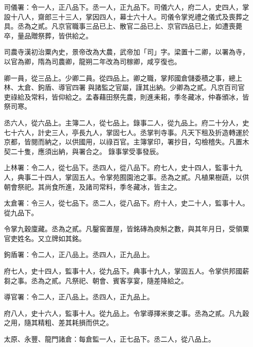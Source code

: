 \begin{pinyinscope}
 司儀署：令一人，正八品下。丞一人，正九品下。司儀六人，府二人，史四人，掌設十八人，齋郎三十三人，掌因四人，幕士六十人。司儀令掌兇禮之儀式及喪葬之具。丞為之貳。凡京官職事三品已上、散官二品已上、京官四品已上，如遭喪薨卒，量品贈祭葬，皆供給之。



 司農寺漢初治粟內史，景帝改為大農，武帝加「司」字。梁置十二卿，以署為寺，以官為卿，隋為司農卿，龍朔二年改為司稼卿，咸亨復也。



 卿一員，從三品上。少卿二員。從四品上。卿之職，掌邦國倉儲委積之事，總上林、太倉、鉤盾、導官四署
 與諸監之官屬，謹其出納。少卿為之貳。凡京百司官吏祿給及常料，皆仰給之。孟春藉田祭先農，則進耒耜，季冬藏冰，仲春頒冰，皆祭司寒。



 丞六人，從六品上。主簿二人，從七品上。錄事二人，從九品上。府二十分人，史七十六人，計史三人，亭長九人，掌固七人。丞掌判寺事。凡天下租及折造轉運於京都，皆閱而納之，以供國用，以祿百官。主簿掌印，署抄目，勾檢稽失。凡置木契二十隻，應須出納，與署合之。
 錄事掌受事發辰。



 上林署：令二人，從七品下。丞四人，從八品下。府七人，史十四人，監事十九人，典事二十四人，掌固五人。令掌苑囿園池之事。丞為之貳。凡植果樹蔬，以供朝會祭祀。其尚食所進，及諸司常料，季冬藏冰，皆主之。



 太倉署：令三人，從七品下。丞二人，從八品下。府十人，史二十人，監事十人。從九品下。



 令掌九穀廩藏。丞為之貳。凡鑿窖置屋，皆銘磚為庾斛之數，與其年月日，受領粟官吏姓名。又立牌如其銘。



 鉤盾署：令二人，正八品上。丞四人，正九品上。



 府七人，史十四人，監事十人，從九品下。典事十九人，掌固五人。令掌供邦國薪芻之事。丞為之貳。凡祭祀、朝會、賓客享宴，隨差降給之。



 導官署：令二人，正八品上。丞四人，正九品上。



 府八人，史十六人，監事十人。從九品上。令掌導擇米麥之事。丞為之貳。凡九穀之用，隨其精粗、差其耗損而供之。



 太原、永豐、龍門諸倉：每倉監一人，正七品下。丞二人，從八品上。




\end{pinyinscope}
